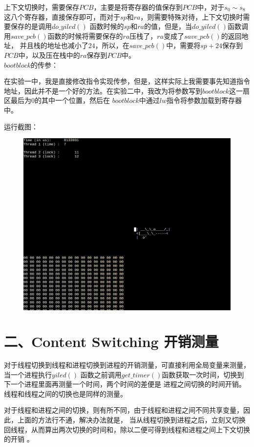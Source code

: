 \documentclass[UTF8,noindent]{ctexart}
\begin{document}
上下文切换时，需要保存$PCB$，主要是将寄存器的值保存到$PCB$中，对于$s_0\sim 
s_8$这八个寄存器，直接保存即可，而对于$sp$和$ra$，则需要特殊对待，上下文切换时需要保存的是调用$do\_yiled()$
函数时候的$sp$和$ra$的值，但是，当$do\_yiled()$函数调用$save\_pcb()$函数的时候将需要保存的$ra$压栈了，$ra$变成了$save\_pcb()$的返回地址，
并且栈的地址也减小了$24$，所以，在$save\_pcb()$中，需要将$sp+24$保存到$PCB$中，以及压在栈中的$ra$保存到$PCB$中。\\

$bootblock$的传参：　

在实验一中，我是直接修改指令实现传参，但是，这样实际上我需要事先知道指令地址，因此并不是一个好的方法。在实验二中，我改为将参数写到$bootblock$这一扇区最后为$0$的其中一个位置，然后在
$bootblock$中通过$lw$指令将参数加载到寄存器中。

运行截图：
\begin{figure}[H]
	\includegraphics[scale=0.5]{fig/1.png}
\end{figure}

\section*{二、Content Switching 开销测量}
对于线程切换到线程和进程切换到进程的开销测量，可直接利用全局变量来测量，当一个进程执行$yiled()$
函数之前调用$get\_timer()$函数获取一次时间，切换到下一个进程里面再测量一个时间，两个时间的差便是
进程之间切换的时间开销。线程和线程之间的切换也是同样的测量。

对于线程和进程之间的切换，则有所不同，由于线程和进程之间不同共享变量，因此，上面的方法行不通，解决办法就是，
当从线程切换到进程之后，立刻又切换回线程，从而算出两次切换的时间和，除以二便可得到线程和进程之间上下文切换的开销
。
\end{document}
